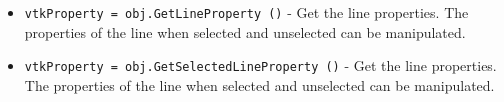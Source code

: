 \begin{itemize}
\item  \verb|vtkProperty = obj.GetLineProperty ()| -  Get the line properties. The properties of the line when selected
 and unselected can be manipulated.

\item  \verb|vtkProperty = obj.GetSelectedLineProperty ()| -  Get the line properties. The properties of the line when selected
 and unselected can be manipulated.

\end{itemize}
